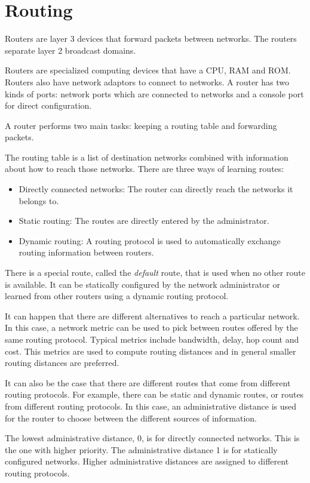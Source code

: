 \chapter{Routing}

Routers are layer 3 devices that forward packets between networks.
The routers separate layer 2 broadcast domains.

Routers are specialized computing devices that have a CPU, RAM and ROM.
Routers also have network adaptors to connect to networks.
A router has two kinds of ports: network ports which are connected to networks and a console port for direct configuration.

A router performs two main tasks: keeping a routing table and forwarding packets.

The routing table is a list of destination networks combined with information about how to reach those networks.
There are three ways of learning routes:
\begin{itemize}
\item Directly connected networks: The router can directly reach the networks it belongs to.
\item Static routing: The routes are directly entered by the administrator.
\item Dynamic routing: A routing protocol is used to automatically exchange routing information between routers.
\end{itemize}

There is a special route, called the \emph{default} route, that is used when no other route is available.
It can be statically configured by the network administrator or learned from other routers using a dynamic routing protocol.

It can happen that there are different alternatives to reach a particular network.
In this case, a network metric can be used to pick between routes offered by the same routing protocol.
Typical metrics include bandwidth, delay, hop count and cost.
This metrics are used to compute routing distances and in general smaller routing distances are preferred.

It can also be the case that there are different routes that come from different routing protocols.
For example, there can be static and dynamic routes, or routes from different routing protocols.
In this case, an administrative distance is used for the router to choose between the different sources of information.

The lowest administrative distance, 0, is for directly connected networks.
This is the one with higher priority.
The administrative distance 1 is for statically configured networks.
Higher administrative distances are assigned to different routing protocols.

